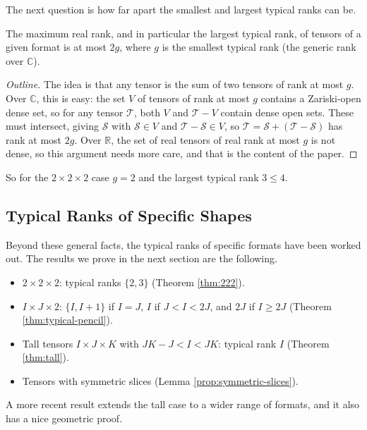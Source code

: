   The next question is how far apart the smallest and largest typical ranks can be. 

  \begin{theorem}
    \label{thm:max-twice-generic}
    The maximum real rank, and in particular the largest typical rank, of tensors of a given format is at most $2g$, where $g$ is the smallest typical rank (the generic rank over $\mathbb{C}$). 
  \end{theorem}
  \begin{proof}[Outline]
    The idea is that any tensor is the sum of two tensors of rank at most $g$. Over $\mathbb{C}$, this is easy: the set $V$ of tensors of rank at most $g$ contains a Zariski-open dense set, so for any tensor $\mathcal{T}$, both $V$ and $\mathcal{T} - V$ contain dense open sets. These must intersect, giving $\mathcal{S}$ with $\mathcal{S} \in V$ and $\mathcal{T} - \mathcal{S} \in V$, so $\mathcal{T} = \mathcal{S} + (\mathcal{T} - \mathcal{S})$ has rank at most $2g$. Over $\mathbb{R}$, the set of real tensors of real rank at most $g$ is not dense, so this argument needs more care, and that is the content of the paper. 
  \end{proof}

  So for the $2 \times 2 \times 2$ case $g = 2$ and the largest typical rank $3 \leq 4$. 

\subsection{Typical Ranks of Specific Shapes}

  Beyond these general facts, the typical ranks of specific formats have been worked out. The results we prove in the next section are the following. 
  \begin{itemize}
    \item $2 \times 2 \times 2$: typical ranks $\{2, 3\}$ (Theorem \ref{thm:222}). 
    \item $I \times J \times 2$: $\{I, I+1\}$ if $I = J$, $I$ if $J < I < 2J$, and $2J$ if $I \geq 2J$ (Theorem \ref{thm:typical-pencil}). 
    \item Tall tensors $I \times J \times K$ with $JK - J < I < JK$: typical rank $I$ (Theorem \ref{thm:tall}). 
    \item Tensors with symmetric slices (Lemma \ref{prop:symmetric-slices}). 
  \end{itemize}
  A more recent result extends the tall case to a wider range of formats, and it also has a nice geometric proof. 

